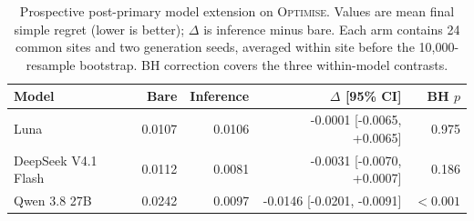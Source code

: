 \begin{table}[t]
\centering
\small
\setlength{\tabcolsep}{4.5pt}
\begin{tabular}{lrrrr}
\toprule
Model & Bare & Inference & $\Delta$ [95\% CI] & BH $p$ \\
\midrule
Luna & 0.0107 & 0.0106 & -0.0001 [-0.0065, +0.0065] & 0.975 \\
DeepSeek V4.1 Flash & 0.0112 & 0.0081 & -0.0031 [-0.0070, +0.0007] & 0.186 \\
Qwen 3.8 27B & 0.0242 & 0.0097 & -0.0146 [-0.0201, -0.0091] & $<0.001$ \\
\bottomrule
\end{tabular}
\caption{Prospective post-primary model extension on \textsc{Optimise}. Values are mean final simple regret (lower is better); $\Delta$ is inference minus bare. Each arm contains 24 common sites and two generation seeds, averaged within site before the 10,000-resample bootstrap. BH correction covers the three within-model contrasts.}
\label{tab:phase5-model-extension}
\end{table}
